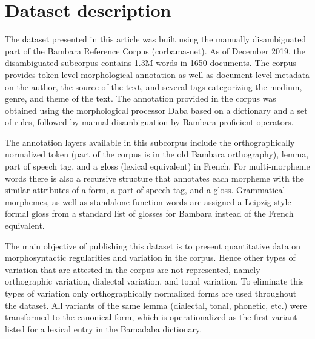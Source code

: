 \documentclass[12pt]{article}
\begin{document}


\section{Dataset description}
\label{sec:data}

The dataset presented in this article was built using the manually
disambiguated part of the Bambara Reference Corpus
(corbama-net). As of December 2019, the
disambiguated subcorpus contains 1.3M words in 1650 documents. The
corpus provides token-level morphological annotation as well as
document-level metadata on the author, the source of the text, and
several tags categorizing the medium, genre, and theme of the
text. The annotation provided in the
corpus was obtained using the morphological processor Daba based on a
dictionary and a set of rules, followed by manual
disambiguation by Bambara-proficient operators.

The annotation layers available in this subcorpus include the
orthographically normalized token (part of the corpus is in the
old Bambara orthography), lemma, part of speech
tag, and a gloss (lexical equivalent) in French. For multi-morpheme
words there is also a recursive structure that annotates each morpheme
with the similar attributes of a form, a part of speech tag, and a
gloss. Grammatical morphemes, as well as standalone function words are
assigned a Leipzig-style formal gloss from a standard list of glosses
for Bambara instead of the French equivalent.

The main objective of publishing this dataset is to present
quantitative data on morphosyntactic regularities and variation in the
corpus. Hence other types of variation that are attested in the corpus
are not represented, namely orthographic variation, dialectal
variation, and tonal variation. To eliminate this types of variation
only orthographically normalized forms are used throughout the
dataset. All variants of the same lemma (dialectal, tonal, phonetic,
etc.) were transformed to the canonical form, which is
operationalized as the first variant listed for a lexical entry in the
Bamadaba dictionary.
\end{document}
